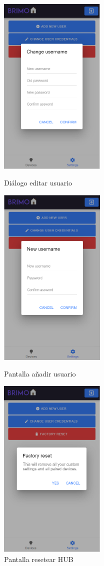\begin{figure}[!htb]
\includegraphics[width=2.00in]{images/screens/edit_username.PNG}
\caption{Diálogo editar usuario}
\label{fig:pantalla_editar_usuario}
\endminipage\hfill
{}
\includegraphics[width=2.00in]{images/screens/new_username.PNG}
\caption{Pantalla añadir usuario}
\label{fig:pantalla_anadir_usuario}
\endminipage\hfill
{}%
\includegraphics[width=2.00in]{images/screens/factory_reset.PNG}
\caption{Pantalla resetear HUB}
\label{fig:pantalla_factory_reset}
\endminipage
\end{figure}


\newpage \thispagestyle{empty} %